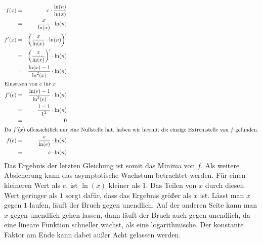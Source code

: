 \documentclass[10pt,a4paper,oneside,ngerman,numbers=noenddot]{scrartcl}
\begin{document}
	\subsection{} %
	\subsection{} %
	\subsection{} %
\section{} %
	\subsection{} %
		\begin{alignat*}{2}
			f(x) &=& x \cdot \frac{\ln(n)}{\ln(x)} \\
			&=& \frac{x}{\ln(x)} \cdot \ln(n) \\
			f'(x) &=& \left(\frac{x}{\ln(x)} \cdot \ln(n)\right)' \\
			&=& \left(\frac{x}{\ln(x)}\right)' \cdot \ln(n) \\
			&=& \frac{\ln(x) - 1}{\ln^{2}(x)} \cdot \ln(n) \\
			\intertext{Einsetzen von $e$ für $x$}
			f'(e) &=& \frac{\ln(e) - 1}{\ln^{2}(e)} \cdot \ln(n) \\
			&=& \frac{1 - 1}{1^{2}} \cdot \ln(n) \\
			&=& 0 \\
			\intertext{Da $f'(x)$ offensichtlich nur eine Nullstelle hat, haben wir hiermit die einzige Extremstelle von $f$ gefunden.}
			f(e) &=& \frac{e}{\ln(e)} \cdot \ln(n) \\
			&=& e \cdot \ln(n)
		\end{alignat*}
		Das Ergebnis der letzten Gleichung ist somit das Minima von $f$. Als weitere Absicherung kann das asymptotische Wachstum betrachtet werden. Für einen kleineren Wert als $e$, ist $\ln(x)$ kleiner als $1$. Das Teilen von $x$ durch diesen Wert geringer als $1$ sorgt dafür, dass das Ergebnis größer als $x$ ist. Lässt man $x$ gegen $1$ laufen, läuft der Bruch gegen unendlich. Auf der anderen Seite kann man $x$ gegen unendlich gehen lassen, dann läuft der Bruch auch gegen unendlich, da eine lineare Funktion schneller wächst, als eine logarithmische. Der konstante Faktor am Ende kann dabei außer Acht gelassen werden.
	\subsection{} %
\end{document}
